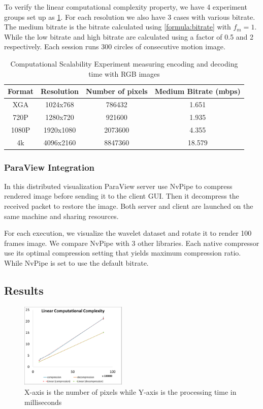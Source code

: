 \documentclass{vgtc}                          %
\begin{document}
To verify the linear computational complexity property, we have 4 experiment groups set up as \ref{table:experiment_setup}. For each resolution we also have 3 cases with various bitrate. The medium bitrate is the bitrate calculated using \ref{formula:bitrate} with \(f_m = 1\). While the low bitrate and high bitrate are calculated using a factor of 0.5 and 2 respectively. Each session runs 300 circles of consecutive motion image.

\begin{table}
  \caption{Computational Scalability Experiment measuring encoding and decoding time with RGB images}
  \label{table:experiment_setup}
  \scriptsize
  \begin{center}
    \begin{tabular}{cccc}
      Format & Resolution & Number of pixels & Medium Bitrate (mbps)\\
    \hline
      XGA &  1024x768 & 786432 & 1.651\\
      720P & 1280x720 & 921600 & 1.935\\
      1080P & 1920x1080 & 2073600 & 4.355\\
      4k & 4096x2160 & 8847360 & 18.579
    \end{tabular}
  \end{center}
\end{table}

\subsubsection{ParaView Integration}

In this distributed visualization ParaView server use NvPipe to compress rendered image before sending it to the client GUI. Then it decompress the received packet to restore the image. Both server and client are launched on the same machine and sharing resources.

For each execution, we visualize the wavelet dataset and rotate it to render 100 frames image. We compare NvPipe with 3 other libraries. Each native compressor use its optimal compression setting that yields maximum compression ratio. While NvPipe is set to use the default bitrate.

\subsection{Results}

\begin{figure}[htb]
  \label{figure:linear}
  \centering
  \includegraphics[width=2.0in]{linear.eps}
  \caption{X-axis is the number of pixels while Y-axis is the processing time in milliseconds}
\end{figure}
\end{document}
